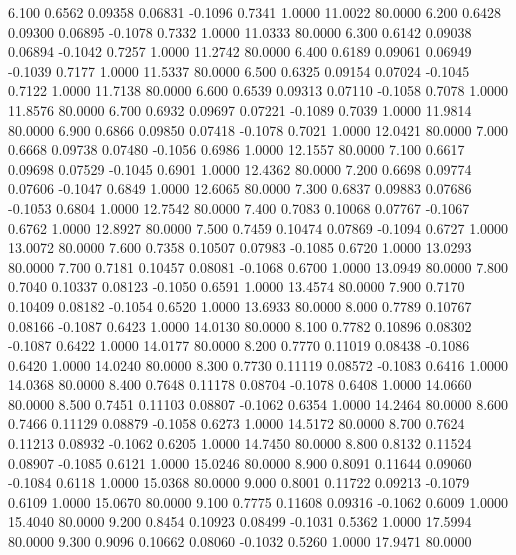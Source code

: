    6.100   0.6562   0.09358   0.06831  -0.1096   0.7341   1.0000  11.0022  80.0000
   6.200   0.6428   0.09300   0.06895  -0.1078   0.7332   1.0000  11.0333  80.0000
   6.300   0.6142   0.09038   0.06894  -0.1042   0.7257   1.0000  11.2742  80.0000
   6.400   0.6189   0.09061   0.06949  -0.1039   0.7177   1.0000  11.5337  80.0000
   6.500   0.6325   0.09154   0.07024  -0.1045   0.7122   1.0000  11.7138  80.0000
   6.600   0.6539   0.09313   0.07110  -0.1058   0.7078   1.0000  11.8576  80.0000
   6.700   0.6932   0.09697   0.07221  -0.1089   0.7039   1.0000  11.9814  80.0000
   6.900   0.6866   0.09850   0.07418  -0.1078   0.7021   1.0000  12.0421  80.0000
   7.000   0.6668   0.09738   0.07480  -0.1056   0.6986   1.0000  12.1557  80.0000
   7.100   0.6617   0.09698   0.07529  -0.1045   0.6901   1.0000  12.4362  80.0000
   7.200   0.6698   0.09774   0.07606  -0.1047   0.6849   1.0000  12.6065  80.0000
   7.300   0.6837   0.09883   0.07686  -0.1053   0.6804   1.0000  12.7542  80.0000
   7.400   0.7083   0.10068   0.07767  -0.1067   0.6762   1.0000  12.8927  80.0000
   7.500   0.7459   0.10474   0.07869  -0.1094   0.6727   1.0000  13.0072  80.0000
   7.600   0.7358   0.10507   0.07983  -0.1085   0.6720   1.0000  13.0293  80.0000
   7.700   0.7181   0.10457   0.08081  -0.1068   0.6700   1.0000  13.0949  80.0000
   7.800   0.7040   0.10337   0.08123  -0.1050   0.6591   1.0000  13.4574  80.0000
   7.900   0.7170   0.10409   0.08182  -0.1054   0.6520   1.0000  13.6933  80.0000
   8.000   0.7789   0.10767   0.08166  -0.1087   0.6423   1.0000  14.0130  80.0000
   8.100   0.7782   0.10896   0.08302  -0.1087   0.6422   1.0000  14.0177  80.0000
   8.200   0.7770   0.11019   0.08438  -0.1086   0.6420   1.0000  14.0240  80.0000
   8.300   0.7730   0.11119   0.08572  -0.1083   0.6416   1.0000  14.0368  80.0000
   8.400   0.7648   0.11178   0.08704  -0.1078   0.6408   1.0000  14.0660  80.0000
   8.500   0.7451   0.11103   0.08807  -0.1062   0.6354   1.0000  14.2464  80.0000
   8.600   0.7466   0.11129   0.08879  -0.1058   0.6273   1.0000  14.5172  80.0000
   8.700   0.7624   0.11213   0.08932  -0.1062   0.6205   1.0000  14.7450  80.0000
   8.800   0.8132   0.11524   0.08907  -0.1085   0.6121   1.0000  15.0246  80.0000
   8.900   0.8091   0.11644   0.09060  -0.1084   0.6118   1.0000  15.0368  80.0000
   9.000   0.8001   0.11722   0.09213  -0.1079   0.6109   1.0000  15.0670  80.0000
   9.100   0.7775   0.11608   0.09316  -0.1062   0.6009   1.0000  15.4040  80.0000
   9.200   0.8454   0.10923   0.08499  -0.1031   0.5362   1.0000  17.5994  80.0000
   9.300   0.9096   0.10662   0.08060  -0.1032   0.5260   1.0000  17.9471  80.0000
